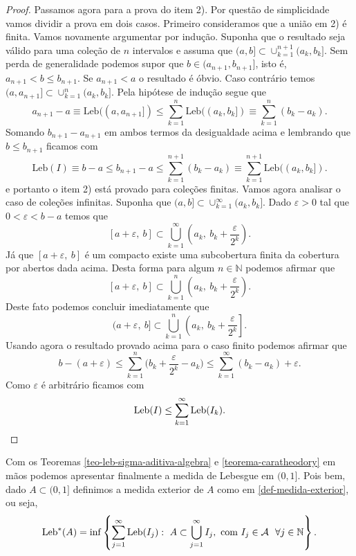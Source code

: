 \begin{proof}
Passamos agora para a prova do item 2). 
Por questão de simplicidade vamos dividir a 
prova em dois casos. Primeiro consideramos 
que a união em 2) é finita.
Vamos novamente argumentar por indução. 
Suponha que o resultado seja válido para
uma coleção de $n$ intervalos e assuma que 
$(a,b]\subset \cup_{k=1}^{n+1} (a_k,b_k]$.
Sem perda de generalidade podemos 
supor que $b\in (a_{n+1},b_{n+1}]$, 
isto é, $a_{n+1}<b\leq b_{n+1}$.
Se $a_{n+1}<a$ o resultado é óbvio.
Caso contrário temos $(a,a_{n+1}]\subset \cup_{k=1}^n (a_k,b_k]$.
Pela hipótese de indução segue que
\[
a_{n+1}-a
\equiv
\mathrm{Leb}((a,a_{n+1}])
\leq
\sum_{k=1}^n \mathrm{Leb}((a_k,b_k])
\equiv
\sum_{k=1}^n (b_k-a_k).
\]
Somando $b_{n+1}-a_{n+1}$ em ambos termos
da desigualdade acima e lembrando que 
$b\leq b_{n+1}$ ficamos com 
\[
\mathrm{Leb}(I)\equiv 
b-a
\leq
b_{n+1}-a
\leq  
\sum_{k=1}^{n+1} (b_k-a_k)
\equiv
\sum_{k=1}^{n+1} \mathrm{Leb}((a_k,b_k]).
\]
e portanto o item 2) está provado 
para coleções finitas. Vamos agora analisar o caso de coleções
infinitas. Suponha que $(a,b]\subset \cup_{k=1}^{\infty}(a_k,b_k]$.
Dado $\varepsilon>0$ tal que $0<\varepsilon<b-a$ temos que 
\[
[a+\varepsilon,\ b]
\subset 
\bigcup_{k=1}^{\infty} \left( a_k,\ b_{k}+\frac{\varepsilon}{2^k}\right).
\]
Já que $[a+\varepsilon,\ b]$ é um compacto existe uma subcobertura
finita da cobertura por abertos dada acima.
Desta forma para algum $n\in\mathbb{N}$ podemos afirmar que 
\[
[a+\varepsilon,\ b]
\subset 
\bigcup_{k=1}^{n} \left( a_k,\ b_{k}+\frac{\varepsilon}{2^k}\right).
\]
Deste fato podemos concluir imediatamente que 
\[
(a+\varepsilon,\ b]
\subset 
\bigcup_{k=1}^{n} \left( a_k,\ b_{k}+\frac{\varepsilon}{2^k}\right].
\]
Usando agora o resultado provado acima para o caso finito 
podemos afirmar que
\[
b-(a+\varepsilon)
\leq 
\sum_{k=1}^n 
\Big(b_k+\frac{\varepsilon}{2^k} -a_k\Big)
\leq
\sum_{k=1}^{\infty} (b_k-a_k)+\varepsilon.
\]
Como $\varepsilon$ é arbitrário ficamos com
\[
\mathrm{Leb}(I)
\leq
\sum_{k=1}^{\infty} \mathrm{Leb}(I_k). 
\qedhere
\]
\end{proof}


Com os Teoremas 
\ref{teo-leb-sigma-aditiva-algebra}
e
\ref{teorema-caratheodory}
em mãos
podemos apresentar finalmente a  medida de Lebesgue
em $(0,1]$.
Pois bem, dado $A\subset (0,1]$ 
definimos a medida exterior de $A$ como
em \eqref{def-medida-exterior}, ou seja,
\[
\textnormal{Leb}^{*}(A)=\inf 
	\left\{
		\sum_{j=1}^\infty \mathrm{Leb}(I_j):
		\ A\subset \bigcup_{j=1}^\infty I_j,
		\ \text{com}\ I_j\in \mathcal{A}\ \ \forall  j\in\mathbb{N}
	\right\}.
\]

